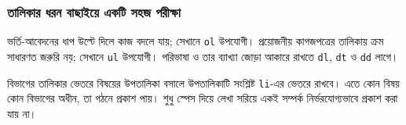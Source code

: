 \subsubsection{তালিকার ধরন বাছাইয়ে একটি সহজ পরীক্ষা}
ভর্তি-আবেদনের ধাপ উল্টে দিলে কাজ বদলে যায়; সেখানে \texttt{ol} উপযোগী। প্রয়োজনীয় কাগজপত্রের তালিকায় ক্রম সাধারণত জরুরি নয়; সেখানে \texttt{ul} উপযোগী। পরিভাষা ও তার ব্যাখ্যা জোড়া আকারে রাখতে \texttt{dl}, \texttt{dt} ও \texttt{dd} লাগে।

বিভাগের তালিকার ভেতরে বিষয়ের উপতালিকা বসালে উপতালিকাটি সংশ্লিষ্ট \texttt{li}-এর ভেতরে রাখবে। এতে কোন বিষয় কোন বিভাগের অধীন, তা গঠনে প্রকাশ পায়। শুধু স্পেস দিয়ে লেখা সরিয়ে একই সম্পর্ক নির্ভরযোগ্যভাবে প্রকাশ করা যায় না।
